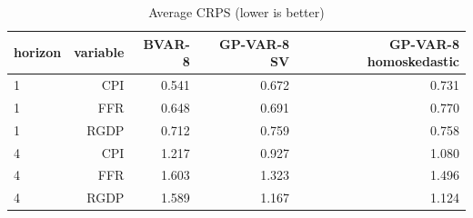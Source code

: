 \begin{table}[htbp]
\centering
\caption{Average CRPS (lower is better)}
\label{tab:crps}
\begin{tabular}{lrrrr}
\toprule
horizon & variable & BVAR-8 & GP-VAR-8 SV & GP-VAR-8 homoskedastic \\
\midrule
1 & CPI & 0.541 & 0.672 & 0.731 \\
1 & FFR & 0.648 & 0.691 & 0.770 \\
1 & RGDP & 0.712 & 0.759 & 0.758 \\
4 & CPI & 1.217 & 0.927 & 1.080 \\
4 & FFR & 1.603 & 1.323 & 1.496 \\
4 & RGDP & 1.589 & 1.167 & 1.124 \\
\bottomrule
\end{tabular}
\end{table}